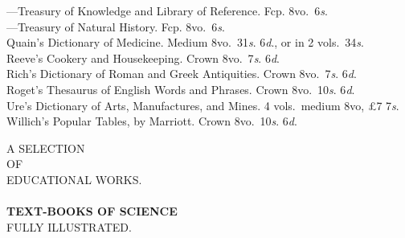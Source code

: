 \documentclass[letterpaper,12pt,oneside,openany]{memoir}
\newcommand{\E}{\hspace*{2mm}---\hspace*{2mm}}
\begin{document}
\begin{footnotesize}
\E Treasury of Knowledge and Library of Reference. Fcp. 8vo.\ 6\textit{s}.\\
\E Treasury of Natural History. Fcp. 8vo.\ 6\textit{s}.\\
Quain's Dictionary of Medicine. Medium 8vo.\ 31\textit{s}. 6\textit{d}., or in 2 vols.\ 34\textit{s}.\\
Reeve's Cookery and Housekeeping. Crown 8vo.\ 7\textit{s}. 6\textit{d}.\\
Rich's Dictionary of Roman and Greek Antiquities. Crown 8vo.\ 7\textit{s}. 6\textit{d}.\\
Roget's Thesaurus of English Words and Phrases. Crown 8vo.\ 10\textit{s}. 6\textit{d}.\\
Ure's Dictionary of Arts, Manufactures, and Mines. 4 vols.\ medium 8vo, \pounds7 7\textit{s}.\\
Willich's Popular Tables, by Marriott. Crown 8vo.\ 10\textit{s}. 6\textit{d}.
\end{footnotesize}
\clearpage
\begin{center}
{\large A SELECTION}\\
{\small OF}\\
{\large EDUCATIONAL WORKS.}\\
\makebox[2in]{\hrulefill}\\
\bigskip
{\footnotesize\textbf{TEXT-BOOKS OF SCIENCE}}\\
{\tiny FULLY ILLUSTRATED.}
\end{center}
\end{document}
